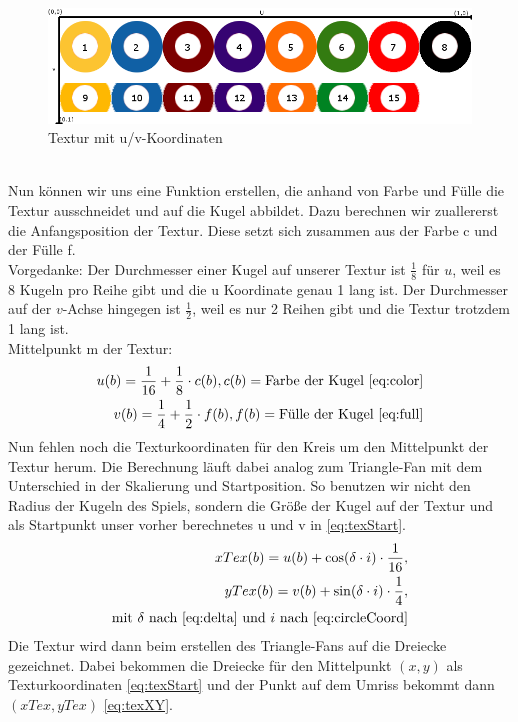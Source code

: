 	\begin{figure}[h]
		\caption{Textur mit u/v-Koordinaten}
		\includegraphics[width=\textwidth]{bilder/ballsachsen}
	\end{figure} \\
	Nun können wir uns eine Funktion erstellen, die anhand von Farbe und Fülle die Textur ausschneidet und auf die Kugel abbildet. 
	Dazu berechnen wir zuallererst die Anfangsposition der Textur. 
	Diese setzt sich zusammen aus der Farbe c und der Fülle f. \\
	Vorgedanke: Der Durchmesser einer Kugel auf unserer Textur ist $\frac{1}{8}$ für $u$, weil es 8 Kugeln pro Reihe gibt und die u Koordinate genau 1 lang ist. Der Durchmesser auf der $v$-Achse hingegen ist $\frac{1}{2}$, weil es nur 2 Reihen gibt und die Textur trotzdem 1 lang ist. \\
	Mittelpunkt m der Textur: \\
	\begin{equation}\label{eq:texStart}
	\begin{aligned} 
		u(b) = \frac{1}{16} + \frac{1}{8} \cdot c(b), c(b) = \text{Farbe der Kugel \eqref{eq:color}} \\
		v(b) = \frac{1}{4} + \frac{1}{2} \cdot f(b), f(b) = \text{Fülle der Kugel \eqref{eq:full}}
	\end{aligned}
	\end{equation}
	Nun fehlen noch die Texturkoordinaten für den Kreis um den Mittelpunkt der Textur herum.
	Die Berechnung läuft dabei analog zum Triangle-Fan mit dem Unterschied in der Skalierung und Startposition. 
	So benutzen wir nicht den Radius der Kugeln des Spiels, sondern die Größe der Kugel auf der Textur und als Startpunkt unser vorher berechnetes u und v in \eqref{eq:texStart}. 
	\begin{equation}\label{eq:texXY}
	\begin{aligned}
		 xTex(b) =  u(b) + \cos(\delta \cdot i) \cdot \frac{1}{16}, \\
		 yTex(b) =  v(b) + \sin(\delta \cdot i) \cdot \frac{1}{4}, \\
		\text{mit } \delta \text{ nach }\eqref{eq:delta} \text{ und } i \text{ nach } \eqref{eq:circleCoord}
	\end{aligned}
	\end{equation}
	Die Textur wird dann beim erstellen des Triangle-Fans auf die Dreiecke gezeichnet. Dabei bekommen die Dreiecke für den Mittelpunkt $(x,y)$ als Texturkoordinaten \eqref{eq:texStart} und der Punkt auf dem Umriss bekommt dann $(xTex,yTex)$ \eqref{eq:texXY}.
